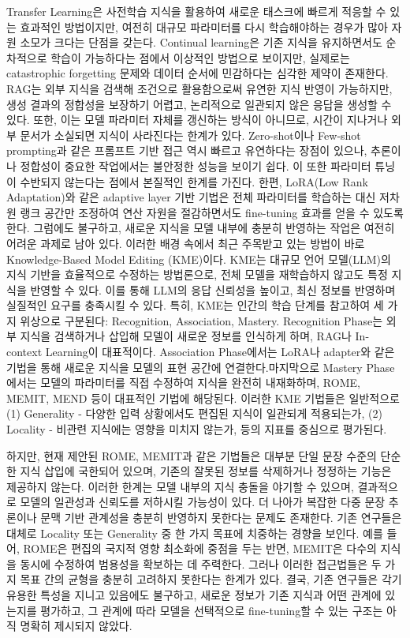 \documentclass[a4paper,fleqn]{cas-sc}
\begin{document}
Transfer Learning은 사전학습 지식을 활용하여 새로운 태스크에 빠르게 적응할 수 있는 효과적인 방법이지만, 여전히 대규모 파라미터를 다시 학습해야하는 경우가 많아 자원 소모가 크다는 단점을 갖는다.
Continual learning은 기존 지식을 유지하면서도 순차적으로 학습이 가능하다는 점에서 이상적인 방법으로 보이지만, 실제로는 catastrophic forgetting 문제와 데이터 순서에 민감하다는 심각한 제약이 존재한다. 
RAG는 외부 지식을 검색해 조건으로 활용함으로써 유연한 지식 반영이 가능하지만, 생성 결과의 정합성을 보장하기 어렵고, 논리적으로 일관되지 않은 응답을 생성할 수 있다. 또한, 이는 모델 파라미터 자체를 갱신하는 방식이 아니므로, 시간이 지나거나 외부 문서가 소실되면 지식이 사라진다는 한계가 있다. 
Zero-shot이나 Few-shot prompting과 같은 프롬프트 기반 접근 역시 빠르고 유연하다는 장점이 있으나, 추론이나 정합성이 중요한 작업에서는 불안정한 성능을 보이기 쉽다. 이 또한 파라미터 튜닝이 수반되지 않는다는 점에서 본질적인 한계를 가진다.
한편, LoRA(Low Rank Adaptation)와 같은 adaptive layer 기반 기법은 전체 파라미터를 학습하는 대신 저차원 랭크 공간만 조정하여 연산 자원을 절감하면서도 fine-tuning 효과를 얻을 수 있도록한다. 그럼에도 불구하고, 새로운 지식을 모델 내부에 충분히 반영하는 작업은 여전히 어려운 과제로 남아 있다.
이러한 배경 속에서 최근 주목받고 있는 방법이 바로 Knowledge-Based Model Editing (KME)이다.
KME는 대규모 언어 모델(LLM)의 지식 기반을 효율적으로 수정하는 방법론으로, 전체 모델을 재학습하지 않고도 특정 지식을 반영할 수 있다.
이를 통해 LLM의 응답 신뢰성을 높이고, 최신 정보를 반영하며 실질적인 요구를 충족시킬 수 있다.
특히, KME는 인간의 학습 단계를 참고하여 세 가지 위상으로 구분된다: Recognition, Association, Mastery. Recognition Phase는 외부 지식을 검색하거나 삽입해 모델이 새로운 정보를 인식하게 하며, RAG나 In-context Learning이 대표적이다. Association Phase에서는 LoRA나 adapter와 같은 기법을 통해 새로운 지식을 모델의 표현 공간에 연결한다.마지막으로 Mastery Phase에서는 모델의 파라미터를 직접 수정하여 지식을 완전히 내재화하며, ROME, MEMIT, MEND 등이 대표적인 기법에 해당된다.
이러한 KME 기법들은 일반적으로 (1) Generality - 다양한 입력 상황에서도 편집된 지식이 일관되게 적용되는가, (2) Locality - 비관련 지식에는 영향을 미치지 않는가, 등의 지표를 중심으로 평가된다. 


하지만, 현재 제안된 ROME, MEMIT과 같은 기법들은 대부분 단일 문장 수준의 단순한 지식 삽입에 국한되어 있으며, 기존의 잘못된 정보를 삭제하거나 정정하는 기능은 제공하지 않는다. 
이러한 한계는 모델 내부의 지식 충돌을 야기할 수 있으며, 결과적으로 모델의 일관성과 신뢰도를 저하시킬 가능성이 있다. 더 나아가 복잡한 다중 문장 추론이나 문맥 기반 관계성을 충분히 반영하지 못한다는 문제도 존재한다.
기존 연구들은 대체로 Locality 또는 Generality 중 한 가지 목표에 치중하는 경향을 보인다. 예를 들어, ROME은 편집의 국지적 영향 최소화에 중점을 두는 반면, MEMIT은 다수의 지식을 동시에 수정하여 범용성을 확보하는 데 주력한다. 그러나 이러한 접근법들은 두 가지 목표 간의 균형을 충분히 고려하지 못한다는 한계가 있다. 
결국, 기존 연구들은 각기 유용한 특성을 지니고 있음에도 불구하고, 새로운 정보가 기존 지식과 어떤 관계에 있는지를 평가하고, 그 관계에 따라 모델을 선택적으로 fine-tuning할 수 있는 구조는 아직 명확히 제시되지 않았다.
\end{document}
